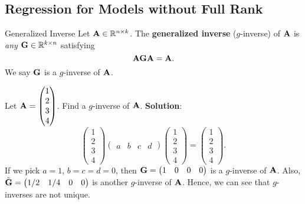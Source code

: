 \subsection*{Regression for Models without Full Rank}
\begin{Definition}{Generalized Inverse}{}
    Let $ \mathbf{A}\in\mathbb{R}^{n\times k} $. The
    \textbf{generalized inverse} ($ g $-inverse) of $ \mathbf{A} $
    is \emph{any} $ \mathbf{G}\in\mathbb{R}^{k\times n} $ satisfying
    \[ \mathbf{AGA}=\mathbf{A}. \]
    We say $ \mathbf{G} $ is a $ g $-inverse of $ \mathbf{A} $.
\end{Definition}
\begin{Example}{}{}
    Let
    $ \mathbf{A}=\begin{pmatrix}
            1 \\
            2 \\
            3 \\
            4
        \end{pmatrix} $.
    Find a $ g $-inverse of $\mathbf{A}$.
    \tcblower{}
    \textbf{Solution}:
    \[
        \begin{pmatrix}
            1 \\
            2 \\
            3 \\
            4
        \end{pmatrix}
        \begin{pmatrix}
            a & b & c & d
        \end{pmatrix}
        \begin{pmatrix}
            1 \\
            2 \\
            3 \\
            4
        \end{pmatrix}
        =\begin{pmatrix}
            1 \\
            2 \\
            3 \\
            4
        \end{pmatrix}. \]
    If we pick $ a=1 $, $ b=c=d=0 $, then $ \mathbf{G}=\begin{pmatrix}
            1 & 0 & 0 & 0
        \end{pmatrix} $ is a $ g $-inverse of $ \mathbf{A} $. Also, $ \tilde{\mathbf{G}}=\begin{pmatrix}
            1/2 & 1/4 & 0 & 0
        \end{pmatrix} $ is another $ g $-inverse of $ \mathbf{A} $. Hence, we can see that
    $ g $-inverses are not unique.
\end{Example}
